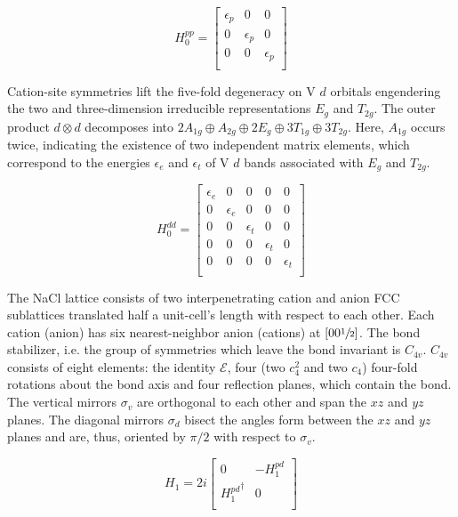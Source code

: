 \documentclass[twocolumn,showpacs,preprintnumbers,superscriptaddress,prb,floatfix,aps,10pt]{revtex4-1}
\newcommand*{\id}{\mathcal{E}}
\begin{document}
\begin{equation}
H_0^{pp} =
\begin{bmatrix}
\epsilon_{p} & 0 & 0 \\
0 & \epsilon_{p} & 0 \\
0 & 0 & \epsilon_{p} \\
\end{bmatrix}
\end{equation}

Cation-site symmetries lift the five-fold degeneracy on V $d$ orbitals engendering the two and three-dimension irreducible representations $E_g$ and $T_{2g}$. The outer product $d \otimes d$ decomposes into $2 A_{1g} \oplus A_{2g} \oplus 2 E_g \oplus 3 T_{1g} \oplus 3 T_{2g}$. Here, $A_{1g}$ occurs twice, indicating the existence of two independent matrix elements, which correspond to the energies $\epsilon_e$ and $\epsilon_t$ of V $d$ bands associated with $E_g$ and $T_{2g}$.

\begin{equation}
H_0^{dd} =
\begin{bmatrix}
 \epsilon_{e} & 0 & 0 & 0 & 0 \\
 0 & \epsilon_{e} & 0 & 0 & 0 \\
 0 & 0 & \epsilon_{t} & 0 & 0 \\
 0 & 0 & 0 & \epsilon_{t} & 0 \\
 0 & 0 & 0 & 0 & \epsilon_{t} \\
\end{bmatrix}
\end{equation}

The NaCl lattice consists of two interpenetrating cation and anion FCC sublattices translated half a unit-cell's length with respect to each other. Each cation (anion) has six nearest-neighbor anion (cations) at $\left[0 0 \sfrac{1}{2}\right]$. The bond stabilizer, i.e. the group of symmetries which leave the bond invariant is $C_{4v}$. $C_{4v}$ consists of eight elements: the identity $\id$, four (two $c_{4}^2$ and two $c_4$) four-fold rotations about the bond axis and four reflection planes, which contain the bond. The vertical mirrors $\sigma_v$ are orthogonal to each other and span the $xz$ and $yz$ planes. The diagonal mirrors $\sigma_d$ bisect the angles form between the $xz$ and $yz$ planes and are, thus, oriented by $\pi/2$ with respect to $\sigma_v$.

\begin{equation}
H_1 = 2i
\begin{bmatrix}
0                  & -H_1^{pd} \\
{H_1^{pd}}^\dagger &  0        \\
\end{bmatrix}
\end{equation}
\end{document}
